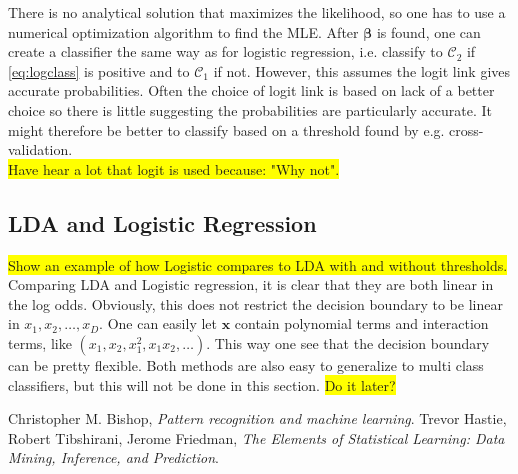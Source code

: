 \documentclass[10pt,a4paper]{article}
\begin{document}
There is no analytical solution that maximizes the likelihood, so one has to use a numerical optimization algorithm to find the MLE.  
After $\bm \beta$ is found, one can create a classifier the same way as for logistic regression, i.e. classify to $\mathcal{C}_2$ if \eqref{eq:logclass} is positive and to $\mathcal{C}_1$ if not. However, this assumes the logit link gives accurate probabilities. Often the choice of logit link is based on lack of a better choice so there is little suggesting the probabilities are particularly accurate. It might therefore be better to classify based on a threshold found by e.g. cross-validation. 
\\\colorbox{yellow}{Have hear a lot that logit is used because: "Why not".}
%
\subsection{LDA and Logistic Regression}
\label{sub:LDA and Logistic Regre}
\colorbox{yellow}{Show an example of how Logistic compares to LDA with and without thresholds.}\\
Comparing LDA and Logistic regression, it is clear that they are both linear in the log odds. Obviously, this does not restrict the decision boundary to be linear in $x_1, x_2, \ldots , x_D$. One can easily let $\mathbf{x}$ contain polynomial terms and interaction terms, like $(x_1, x_2, x_1^2, x_1 x_2, \ldots )$. This way one see that the decision boundary can be pretty flexible. Both methods are also easy to generalize to multi class classifiers, but this will not be done in this section.
\colorbox{yellow}{Do it later?}



%
\clearpage
\begin{thebibliography}{99} %
  Christopher M. Bishop,
  \emph{Pattern recognition and machine learning}.
  Trevor Hastie, Robert Tibshirani, Jerome Friedman,
  \emph{The Elements of Statistical Learning: Data Mining, Inference, and Prediction}.
\end{thebibliography}
%
\end{document}
